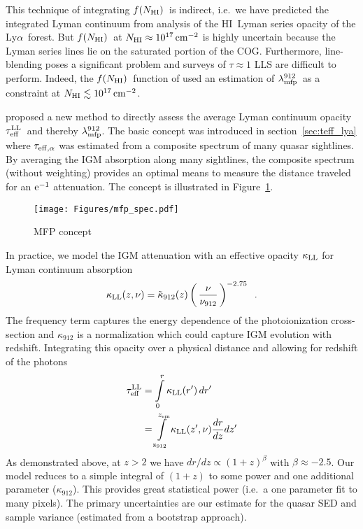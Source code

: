 \documentclass[graybox]{svmult}
\newcommand{\HI}{H{\sc I}}
\def\lya{Ly$\alpha$}
\def\ltp{\left ( \,}
\def\rtp{\, \right  ) }
\def\intl{\int\limits}
\newcommand{\mnhi}{N_{\rm HI}}
\def\cm#1{\, {\rm cm^{#1}}}
\def\mfnhi{f(\mnhi)}
\def\fnhi{$\mfnhi$}
\def\mlmfp{\lambda_{\rm mfp}^{912}}
\def\lmfp{$\mlmfp$}
\def\mtll{\tau_{\rm eff}^{\rm LL}}
\def\tll{$\mtll$}
\begin{document}
This technique of integrating \fnhi\ is indirect, i.e.\ we
have predicted the integrated Lyman continuum from
analysis of the \HI\ Lyman series opacity of the \lya\ forest.
But \fnhi\ at $\mnhi \approx 10^{17} \cm{-2}$ is highly uncertain
because the Lyman series lines lie
on the saturated portion of the COG.  Furthermore, 
line-blending poses a significant problem and 
surveys of $\tau \approx 1$ LLS are difficult to perform.
Indeed, the \fnhi\ function of \cite{p14} used an estimation
of \lmfp\ as a constraint at $\mnhi \lesssim 10^{17} \cm{-2}$. 

\cite{pwo09} proposed a new method to directly assess 
the average Lyman continuum opacity \tll\ and thereby \lmfp.
The basic concept was introduced in section~\ref{sec:teff_lya}
where $\tau_{\rm eff, \alpha}$ was estimated from a composite
spectrum of many quasar sightlines.
By averaging the IGM absorption along many sightlines, 
the composite spectrum (without weighting) provides 
an optimal means to
measure the distance traveled for an $\rm e^{-1}$ attenuation.
The concept is illustrated in Figure~\ref{fig:mfp_spec}.

%
\begin{figure}[b]
\sidecaption
\texttt{[image: Figures/mfp\_spec.pdf]}
%
%
\caption{MFP concept
}
\label{fig:mfp_spec}       %
\end{figure}

In practice, we model the IGM attenuation with
an effective opacity $\kappa_{\rm LL}$
for Lyman continuum absorption
\begin{equation}
\kappa_{\rm LL}(z,\nu) = \tilde\kappa_{912}(z) \ltp \frac{\nu}{\nu_{912}} \rtp^{-2.75} \;\; .
\end{equation}
The frequency term captures the energy dependence of the
photoionization cross-section and 
$\kappa_{912}$ is a normalization which could capture IGM evolution 
with redshift.
Integrating this opacity over a physical distance and allowing 
for redshift of the photons
\begin{align}
\mtll &= \intl_0^r \kappa_{\rm LL}(r') \, dr'  \\
&= \intl_{\rm z_{912}}^{z_{\rm em}} \kappa_{\rm LL}(z',\nu) \frac{dr}{dz} dz'
\end{align}
As demonstrated above, at $z>2$ we have
$dr/dz \propto (1+z)^\beta$ with $\beta \approx -2.5$.
Our model reduces to a simple integral
of $(1+z)$ to some power and one additional parameter ($\kappa_{912}$).
This provides great statistical power (i.e.\ a one parameter fit to
many pixels).  The primary
uncertainties are our estimate for the quasar SED
and sample variance (estimated from a bootstrap approach).
\end{document}
